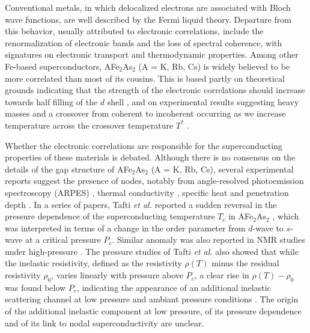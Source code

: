 \documentclass[twocolumn,aps,showpacs,preprintnumbers,amsmath,amssymb, superscriptaddress,longbibliography]{revtex4-1}
\begin{document}
Conventional metals, in which delocalized electrons are associated with Bloch wave functions, are well described by the Fermi liquid theory. Departure from this behavior, usually attributed to electronic correlations, include the renormalization of electronic bands and the loss of spectral coherence, with signatures on electronic transport and thermodynamic properties. Among other Fe-based superconductors, AFe$_2$As$_2$ (A = K, Rb, Cs) is widely believed to be more correlated than most of its cousins. This is based partly on theoretical grounds indicating that the strength of the electronic correlations should increase towards half filling of the $d$ shell \cite{WernerPRL101, HauleNJP11, WernerNatPhys8, deMedici_PRL107, vanRoekeghemCR17}, and on experimental results suggesting heavy masses and a crossover from coherent to incoherent occurring as we increase temperature across the crossover temperature $T^*$ \cite{Hardy_PRL111, YP_Wu_PRL116, Wiecki_PRB97}. %

Whether the electronic correlations are responsible for the superconducting properties of these materials is debated. Although there is no consensus on the details of the gap structure of AFe$_2$As$_2$ (A = K, Rb, Cs), several experimental reports suggest the presence of nodes, notably from angle-resolved photoemission spectroscopy (ARPES) \cite{Okazaki_Science337}, thermal conductivity \cite{JK_DongPRL2010,ReidPRL109,XC_HongPRB87,AF_WangPRB89, Z_Zhang_PRB91}, specific heat \cite{Abdel-HafiezPRB85,AF_WangPRB87,KittakaJPSJ2014} and penetration depth \cite{Hashimoto_PRB82,Mizukami_PRB89}. In a series of papers, Tafti \textit{et al.} reported a sudden reversal in the pressure dependence of the superconducting temperature $T_c$ in AFe$_2$As$_2$ \cite{Tafti_nphys9,Tafti_PRB89,Tafti_PRB91}, which was interpreted in terms of a change in the order parameter from $d$-wave to $s$-wave at a critical pressure $P_c$. Similar anomaly was also reported in NMR studies under high-pressure \cite{PS_WangPRB93,Wiecki_PRB97}. The pressure studies of Tafti \textit{et al.} also showed that while the inelastic resistivity, defined as the resistivity $\rho(T)$ minus the residual resistivity $\rho_0$, varies linearly with pressure above $P_c$, a clear rise in $\rho(T)-\rho_0$ was found below $P_c$, indicating the appearance of an additional inelastic scattering channel at low pressure and ambiant pressure conditions \cite{Tafti_PRB89,Tafti_PRB91}. The origin of the additional inelastic component at low pressure, of its pressure dependence and of its link to nodal superconductivity are unclear. 
\end{document}
